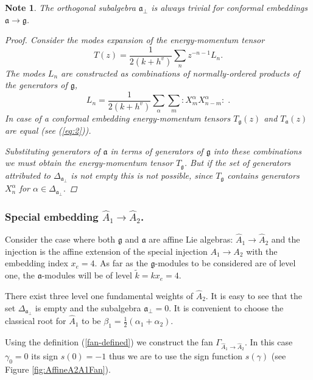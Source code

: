 \documentclass[12pt]{iopart}
\newtheorem{mynote}{Note}[section]
\theoremstyle{definition}
\newcommand{\gf}{\mathfrak{g}}
\newcommand{\af}{\mathfrak{a}}
\newcommand{\afb}{\mathfrak{a}_{\bot}}
\begin{document}
\begin{mynote} The orthogonal subalgebra $\afb$ is always trivial
for conformal embeddings $\af\longrightarrow \mathfrak{g}$.
\begin{proof}
Consider the modes expansion of the energy-momentum tensor
\begin{equation*}
\label{eq:47}
  T(z)=\frac{1}{2(k+h^v)}\sum_n z^{-n-1}L_n.
\end{equation*}
The modes $L_n$ are constructed as combinations of normally-ordered products of the generators of $\mathfrak{g}$,
\begin{equation*}
\label{eq:48}
  L_n=\frac{1}{2(k+h^v)}\sum_{\alpha}\sum_m:X^{\alpha}_m X^{\alpha}_{n-m}: \; .
\end{equation*}
In case of a conformal embedding energy-momentum tensors $T_{\mathfrak{g}}(z)$ and $T_{\af}(z)$ are
equal (see (\ref{eq:2})).

Substituting generators of $\af$  in terms of generators of $\mathfrak{g}$ into these combinations
we must obtain the energy-momentum tensor $T_{\mathfrak{g}}$.
But if the set of generators attributed to $\Delta_{\afb}$ is not empty this is not possible,
since $T_{\mathfrak{g}}$ contains generators $X^{\alpha}_n$ for $\alpha\in \Delta_{\afb}$.
\end{proof}
\end{mynote}



\subsubsection{Special embedding $\hat{A}_1\rightarrow\hat{A}_2$.}
\label{sec:spec-embedd-hata_1s}

Consider the case where both $\gf$ and $\af$ are affine Lie algebras:
$\hat{A}_1 \rightarrow \hat{A}_2$ and the injection is the affine extension of the
special injection $A_1 \rightarrow A_2$ with the embedding index $x_e=4$.
As far as the $\gf$-modules to be considered are of level one,
the $\af$-modules will be of level $\tilde{k}=kx_e=4$.

There exist three level one fundamental weights of $\hat{A}_2$.
It is easy to see that the set $\Delta_{\afb}$ is empty and the subalgebra $\afb=0$.
It is convenient to choose the classical root for $\hat{A}_1$ to be
$\beta_1=\frac{1}{2}(\alpha_1+\alpha_2)$.

Using the definition (\ref{fan-defined})  we construct the fan $\Gamma_{\hat A_1\to\hat A_2}$.
In this case $\gamma_0 =0$ its sign $s\left( 0 \right)=-1$ thus we are to use the
sign function $s(\gamma)$ (see Figure \ref{fig:AffineA2A1Fan}).
\end{document}
